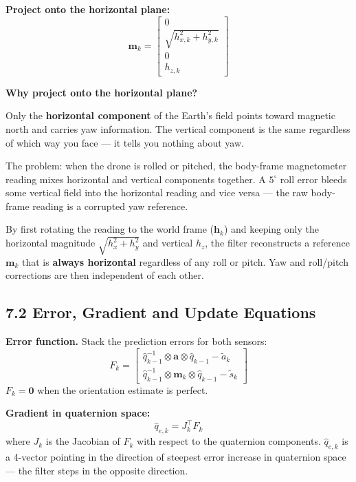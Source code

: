\documentclass[12pt, a4paper]{article}
\begin{document}
\textbf{Project onto the horizontal plane:}
\[
  \mathbf{m}_k
  = \begin{bmatrix} 0 \\[2pt]
      \sqrt{h_{x,k}^2 + h_{y,k}^2} \\[2pt] 0 \\[2pt] h_{z,k}
    \end{bmatrix}
\]

\begin{notebox}
  \textbf{Why project onto the horizontal plane?}

  Only the \textbf{horizontal component} of the Earth's field points
  toward magnetic north and carries yaw information.
  The vertical component is the same regardless of which way you face ---
  it tells you nothing about yaw.

  The problem: when the drone is rolled or pitched, the body-frame
  magnetometer reading mixes horizontal and vertical components together.
  A $5^\circ$ roll error bleeds some vertical field into the horizontal
  reading and vice versa --- the raw body-frame reading is a corrupted yaw
  reference.

  By first rotating the reading to the world frame ($\mathbf{h}_k$)
  and keeping only the horizontal magnitude
  $\sqrt{h_x^2 + h_y^2}$ and vertical $h_z$, the filter reconstructs a
  reference $\mathbf{m}_k$ that is \textbf{always horizontal} regardless
  of any roll or pitch.
  Yaw and roll/pitch corrections are then independent of each other.
\end{notebox}

\subsection*{7.2 \quad Error, Gradient and Update Equations}

\textbf{Error function.}
Stack the prediction errors for both sensors:
\[
  F_k =
  \begin{bmatrix}
    \hat{q}_{k-1}^{-1} \otimes \mathbf{a} \otimes \hat{q}_{k-1}
    - \tilde{a}_k \\[4pt]
    \hat{q}_{k-1}^{-1} \otimes \mathbf{m}_k \otimes \hat{q}_{k-1}
    - \tilde{s}_k
  \end{bmatrix}
\]
$F_k = \mathbf{0}$ when the orientation estimate is perfect.

\textbf{Gradient in quaternion space:}
\[
  \hat{q}_{e,k} = J_k^\top F_k
\]
where $J_k$ is the Jacobian of $F_k$ with respect to the quaternion
components.
$\hat{q}_{e,k}$ is a 4-vector pointing in the direction of steepest error
increase in quaternion space --- the filter steps in the opposite direction.
\end{document}
